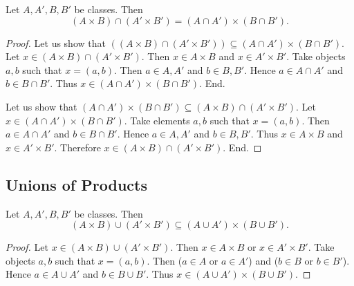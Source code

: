 \documentclass[10pt]{article}
\begin{document}
  \begin{forthel}
    \begin{proposition}
      Let $A, A', B, B'$ be classes.
      Then \[ (A \times B) \cap (A' \times B') =
      (A \cap A') \times (B \cap B'). \]
    \end{proposition}
    \begin{proof}
      Let us show that $((A \times B) \cap (A' \times B')) \subseteq
      (A \cap A') \times (B \cap B')$. %
        Let $x \in (A \times B) \cap (A' \times B')$.
        Then $x \in A \times B$ and $x \in A' \times B'$.
        Take objects $a, b$ such that $x = (a, b)$.
        Then $a \in A, A'$ and $b \in B, B'$.
        Hence $a \in A \cap A'$ and $b \in B \cap B'$.
        Thus $x \in (A \cap A') \times (B \cap B')$.
      End.

      Let us show that $(A \cap A') \times (B \cap B') \subseteq
      (A \times B) \cap (A' \times B')$.
        Let $x \in (A \cap A') \times (B \cap B')$.
        Take elements $a, b$ such that $x = (a, b)$.
        Then $a \in A \cap A'$ and $b \in B \cap B'$.
        Hence $a \in A, A'$ and $b \in B, B'$.
        Thus $x \in A \times B$ and $x \in A' \times B'$.
        Therefore $x \in (A \times B) \cap (A' \times B')$.
      End.
    \end{proof}
  \end{forthel}


  \subsection{Unions of Products}

  \begin{forthel}
    \begin{proposition}
      Let $A, A', B, B'$ be classes.
      Then \[ (A \times B) \cup (A' \times B') \subseteq
      (A \cup A') \times (B \cup B'). \]
    \end{proposition}
    \begin{proof}
      Let $x \in (A \times B) \cup (A' \times B')$.
      Then $x \in A \times B$ or $x \in A' \times B'$.
      Take objects $a, b$ such that $x = (a, b)$.
      Then ($a \in A$ or $a \in A'$) and ($b \in B$ or $b \in B'$).
      Hence $a \in A \cup A'$ and $b \in B \cup B'$.
      Thus $x \in (A \cup A') \times (B \cup B')$.
    \end{proof}
  \end{forthel}
\end{document}
